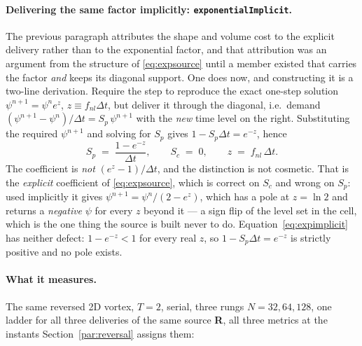 \documentclass[preprint,3p,11pt]{elsarticle}
\newcommand{\psilev}{\psi}
\begin{document}
\paragraph{Delivering the same factor implicitly: \texttt{exponentialImplicit}.}
\label{par:expimplicit}
The previous paragraph attributes the shape and volume cost to the explicit
delivery rather than to the exponential factor, and that attribution was an
argument from the structure of \eqref{eq:expsource} until a member existed that
carries the factor \emph{and} keeps its diagonal support. One does now, and
constructing it is a two-line derivation. Require the step to reproduce the exact
one-step solution $\psilev^{n+1} = \psilev^n e^{z}$, $z \equiv f_{nl}\Delta t$, but
deliver it through the diagonal, i.e.\ demand
$(\psilev^{n+1} - \psilev^{n})/\Delta t = S_p\,\psilev^{n+1}$ with the
\emph{new} time level on the right. Substituting the required $\psilev^{n+1}$ and
solving for $S_p$ gives $1 - S_p\Delta t = e^{-z}$, hence
\begin{equation}
  S_p \;=\; \frac{1 - e^{-z}}{\Delta t}, \qquad S_c \;=\; 0,
  \qquad z \;=\; f_{nl}\,\Delta t .
  \label{eq:expimplicit}
\end{equation}
The coefficient is \emph{not} $(e^{z}-1)/\Delta t$, and the distinction is not
cosmetic. That is the \emph{explicit} coefficient of \eqref{eq:expsource}, which is
correct on $S_c$ and wrong on $S_p$: used implicitly it gives
$\psilev^{n+1} = \psilev^{n}/(2 - e^{z})$, which has a pole at $z = \ln 2$ and
returns a \emph{negative} $\psilev$ for every $z$ beyond it --- a sign flip of the
level set in the cell, which is the one thing the source is built never to do.
Equation~\eqref{eq:expimplicit} has neither defect: $1 - e^{-z} < 1$ for every
real $z$, so $1 - S_p\Delta t = e^{-z}$ is strictly positive and no pole exists.

\paragraph{What it measures.} The same reversed 2D vortex, $T=2$, serial, three
rungs $N = 32, 64, 128$, one ladder for all three deliveries of the same source
\textbf{R}, all three metrics at the instants Section~\ref{par:reversal} assigns
them:
\end{document}
